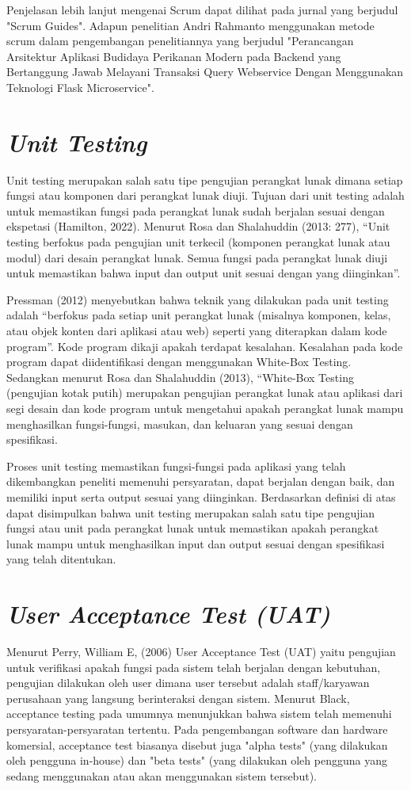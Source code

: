 Penjelasan lebih lanjut mengenai Scrum dapat dilihat pada jurnal \citep{sutherland2020} yang berjudul "Scrum Guides". Adapun penelitian Andri Rahmanto menggunakan metode scrum dalam pengembangan penelitiannya yang berjudul "Perancangan Arsitektur Aplikasi Budidaya Perikanan Modern pada Backend yang Bertanggung Jawab Melayani Transaksi Query Webservice Dengan Menggunakan Teknologi Flask Microservice". 

\section{\textit{Unit Testing}}
Unit testing merupakan salah satu tipe pengujian perangkat lunak dimana setiap fungsi atau komponen dari perangkat lunak diuji. Tujuan dari unit testing adalah untuk memastikan fungsi pada perangkat lunak sudah berjalan sesuai dengan ekspetasi (Hamilton, 2022). Menurut Rosa dan Shalahuddin (2013: 277), “Unit testing berfokus pada pengujian unit terkecil (komponen perangkat lunak atau modul) dari desain perangkat lunak. Semua fungsi pada perangkat lunak diuji untuk memastikan bahwa input dan output unit sesuai dengan yang diinginkan”.

Pressman (2012) menyebutkan bahwa teknik yang dilakukan pada unit testing adalah “berfokus pada setiap unit perangkat lunak (misalnya komponen, kelas, atau objek konten dari aplikasi atau web) seperti yang diterapkan dalam kode program”. Kode program dikaji apakah terdapat kesalahan. Kesalahan pada kode program dapat diidentifikasi dengan menggunakan White-Box Testing. Sedangkan menurut Rosa dan Shalahuddin (2013), “White-Box Testing (pengujian kotak putih) merupakan pengujian perangkat lunak atau aplikasi dari segi desain dan kode program untuk mengetahui apakah perangkat lunak mampu menghasilkan fungsi-fungsi, masukan, dan keluaran yang sesuai dengan spesifikasi.

Proses unit testing memastikan fungsi-fungsi pada aplikasi yang telah dikembangkan peneliti memenuhi persyaratan, dapat berjalan dengan baik, dan memiliki input serta output sesuai yang diinginkan. Berdasarkan definisi di atas dapat disimpulkan bahwa unit testing merupakan salah satu tipe pengujian fungsi atau unit pada perangkat lunak untuk memastikan apakah perangkat lunak mampu untuk menghasilkan input dan output sesuai dengan spesifikasi yang telah ditentukan.

\section{\textit{User Acceptance Test (UAT)}}
Menurut Perry, William E, (2006) User Acceptance Test (UAT) yaitu pengujian untuk verifikasi apakah fungsi pada sistem telah berjalan dengan kebutuhan, pengujian dilakukan oleh user dimana user tersebut adalah staff/karyawan perusahaan yang langsung berinteraksi dengan sistem. Menurut Black, acceptance testing pada umumnya menunjukkan bahwa sistem telah memenuhi persyaratan-persyaratan tertentu. Pada pengembangan software dan hardware komersial, acceptance test biasanya disebut juga "alpha tests" (yang dilakukan oleh pengguna in-house) dan "beta tests" (yang dilakukan oleh pengguna yang sedang menggunakan atau akan menggunakan sistem tersebut).

